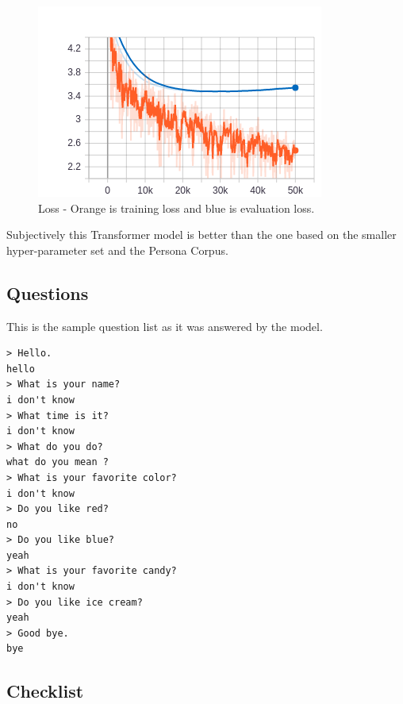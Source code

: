 \begin{figure}[H]
	\begin{center}
		\includegraphics[scale=3.5]{Figure_2}
		
		
	\end{center}
	\caption[Loss - Larger Transformer Model]{Loss - Orange is training loss and blue is evaluation loss.}
	
\end{figure}

Subjectively this Transformer model is better than the one based on the smaller hyper-parameter set and the Persona Corpus.


\subsection{Questions}
This is the sample question list as it was answered by the model.

\begin{verbatim}
> Hello.
hello 
> What is your name?
i don't know 
> What time is it?
i don't know 
> What do you do?
what do you mean ?
> What is your favorite color?
i don't know 
> Do you like red?
no 
> Do you like blue?
yeah 
> What is your favorite candy?
i don't know 
> Do you like ice cream?
yeah 
> Good bye.
bye 
\end{verbatim}

\subsection{Checklist}

